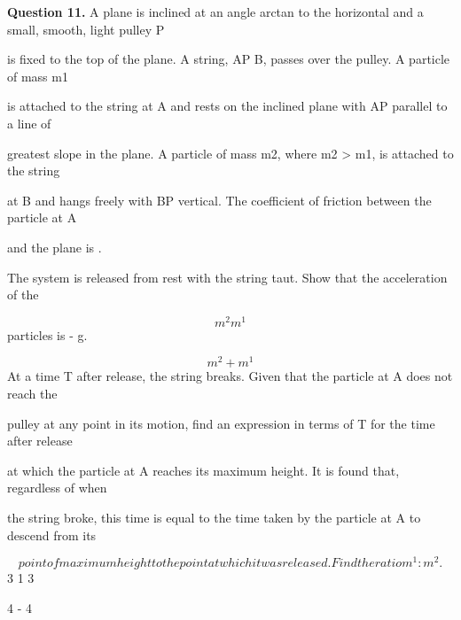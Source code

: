 \documentclass[12pt]{article}
\begin{document}
\begin{flushleft}
\bigskip\textbf{Question 11.} A plane is inclined at an angle arctan to the horizontal and a small, smooth, light pulley P\par
is fixed to the top of the plane. A string, AP B, passes over the pulley. A particle of mass m1\par
is attached to the string at A and rests on the inclined plane with AP parallel to a line of\par
greatest slope in the plane. A particle of mass m2, where m2 > m1, is attached to the string\par
at B and hangs freely with BP vertical. The coefficient of friction between the particle at A\par
and the plane is .\par
The system is released from rest with the string taut. Show that the acceleration of the\par
\[m^2 m^1\]
particles is - g.\par
\[m^2 + m^1\]
At a time T after release, the string breaks. Given that the particle at A does not reach the\par
pulley at any point in its motion, find an expression in terms of T for the time after release\par
at which the particle at A reaches its maximum height. It is found that, regardless of when\par
the string broke, this time is equal to the time taken by the particle at A to descend from its\par
\[point of maximum height to the point at which it was released. Find the ratio m^1 : m^2.\]
3 1 3\par
[Note that arctan is another notation for tan .]\par
4 - 4\par
\end{flushleft}
\end{document}
